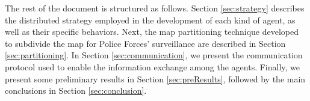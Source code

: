 The rest of the document is structured as follows. Section \ref{sec:strategy} describes the distributed strategy employed in the development of each kind of agent, as well as their specific behaviors. Next, the map partitioning technique developed to subdivide the map for Police Forces' surveillance are described in Section \ref{sec:partitioning}. In Section \ref{sec:communication}, we present the communication protocol used to enable the information exchange among the agents. Finally, we present some preliminary results in Section \ref{sec:preResults}, followed by the main conclusions in Section \ref{sec:conclusion}.
